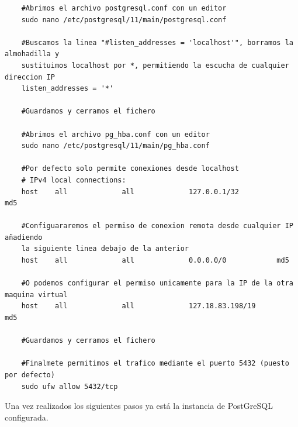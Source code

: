 \begin{verbatim}
	#Abrimos el archivo postgresql.conf con un editor
	sudo nano /etc/postgresql/11/main/postgresql.conf
	
	#Buscamos la linea "#listen_addresses = 'localhost'", borramos la almohadilla y
	sustituimos localhost por *, permitiendo la escucha de cualquier direccion IP
	listen_addresses = '*'
	
	#Guardamos y cerramos el fichero
	
	#Abrimos el archivo pg_hba.conf con un editor
	sudo nano /etc/postgresql/11/main/pg_hba.conf
	
	#Por defecto solo permite conexiones desde localhost
	# IPv4 local connections: 
	host    all             all             127.0.0.1/32            md5 
	
	#Configuararemos el permiso de conexion remota desde cualquier IP añadiendo
	la siguiente linea debajo de la anterior
	host    all             all             0.0.0.0/0            md5 
	
	#O podemos configurar el permiso unicamente para la IP de la otra maquina virtual
	host    all             all             127.18.83.198/19            md5 
	
	#Guardamos y cerramos el fichero
	
	#Finalmete permitimos el trafico mediante el puerto 5432 (puesto por defecto)
	sudo ufw allow 5432/tcp
\end{verbatim}

Una vez realizados los siguientes pasos ya está la instancia de PostGreSQL configurada.




